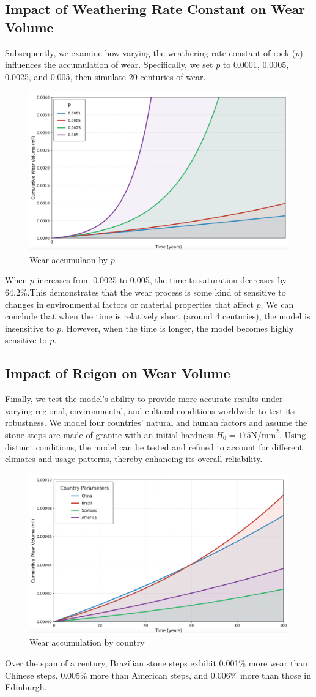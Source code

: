 \documentclass[12pt]{article}  %
\numberwithin{equation}{section} %
\begin{document}
\subsection{Impact of Weathering Rate Constant on Wear Volume}
Subsequently, we examine how varying the weathering rate constant of rock ($p$) influences the accumulation of wear. Specifically, we set $p$ to 0.0001, 0.0005, 0.0025, and 0.005, then simulate 20 centuries of wear.
\begin{figure}[H]
\vspace{-1em}
	\centering
\includegraphics[width=0.5\linewidth]{psa.png}
	\caption{Wear accumulaon by $p$}
	\label{psa}
 \vspace{-1em}
\end{figure}
 When $p$ increases from 0.0025 to 0.005, the time to saturation decreases by 64.2\%.This demonstrates that the wear process is some kind of sensitive to changes in environmental factors or material properties that affect $p$. We can conclude that when the time is relatively short (around 4 centuries), the model is insensitive to $p$. However, when the time is longer, the model becomes highly sensitive to $p$.
\subsection{Impact of Reigon on Wear Volume}
Finally, we test the model's ability to provide more accurate results under varying regional, environmental, and cultural conditions worldwide to test its robustness. We model four countries’ natural and human factors and assume the stone steps are made of granite with an initial hardness $H_0=175\text{N/mm}^2$. 
Using distinct conditions, the model can be tested and refined to account for different climates and usage patterns, thereby enhancing its overall reliability.
\begin{figure}[H]
	\centering
\includegraphics[width=0.5\linewidth]{csa.png}
	\caption{Wear accumulation by country}
	\label{csa}
 \vspace{-1em}
\end{figure}
Over the span of a century, Brazilian stone steps exhibit 0.001\% more wear than Chinese steps, 0.005\% more than American steps, and 0.006\% more than those in Edinburgh.
\end{document}
